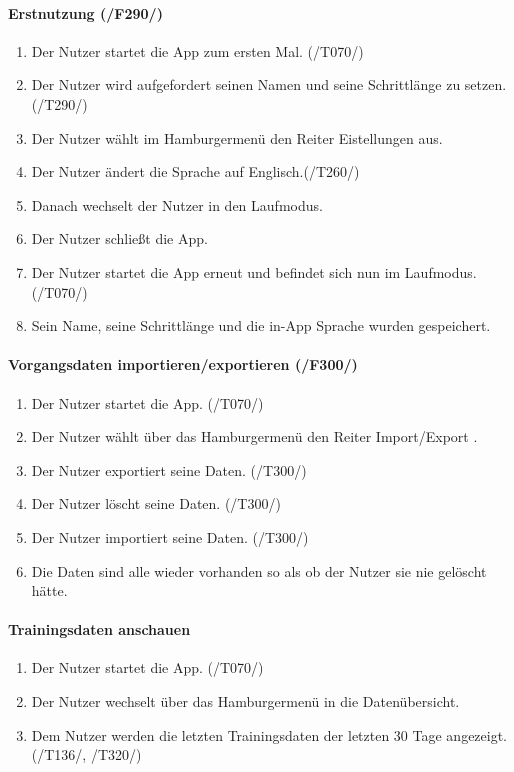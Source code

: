 \documentclass[a4paper,12pt]{article}
\begin{document}
      \paragraph{Erstnutzung (/F290/)}
      \begin{enumerate}
        \item Der Nutzer startet die App zum ersten Mal. (/T070/)
        \item Der Nutzer wird aufgefordert seinen Namen und seine Schrittlänge zu setzen. (/T290/)
        \item Der Nutzer wählt im Hamburgermenü den Reiter Eistellungen aus.
        \item Der Nutzer ändert die Sprache auf Englisch.(/T260/)
        \item Danach wechselt der Nutzer in den \glqq Laufmodus\grqq.
        \item Der Nutzer schließt die App.
        \item Der Nutzer startet die App erneut und befindet sich nun im \glqq Laufmodus\grqq. (/T070/)
        \item Sein Name, seine Schrittlänge und die in-App Sprache wurden gespeichert.
      \end{enumerate}

      \paragraph{Vorgangsdaten importieren/exportieren (/F300/)}
      \begin{enumerate}
        \item Der Nutzer startet die App. (/T070/)
        \item Der Nutzer wählt über das Hamburgermenü den Reiter \glqq{}Import/Export \grqq{}.
        \item Der Nutzer exportiert seine Daten. (/T300/)
        \item Der Nutzer löscht seine Daten. (/T300/)
        \item Der Nutzer importiert seine Daten. (/T300/)
        \item Die Daten sind alle wieder vorhanden so als ob der Nutzer sie nie gelöscht hätte.
      \end{enumerate}

    \paragraph{Trainingsdaten anschauen}
    \begin{enumerate}
	\item Der Nutzer startet die App. (/T070/)
 	\item Der Nutzer wechselt über das Hamburgermenü in die Datenübersicht.
	\item Dem Nutzer werden die letzten Trainingsdaten der letzten 30 Tage angezeigt. (/T136/, /T320/)
    \end{enumerate}
\end{document}
